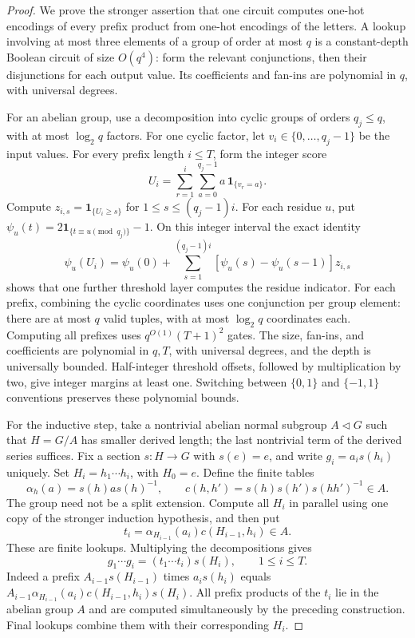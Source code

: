 \begin{proof}
We prove the stronger assertion that one circuit computes one-hot
encodings of every prefix product from one-hot encodings of the letters. A lookup involving at most three elements
of a group of order at most $q$ is a constant-depth Boolean circuit
of size $O(q^4)$: form the relevant conjunctions, then their disjunctions
for each output value. Its coefficients and fan-ins are polynomial in
$q$, with universal degrees.

For an abelian group, use a decomposition into cyclic groups of orders
$q_j\le q$, with at most $\log_2q$ factors. For one cyclic factor, let
$v_i\in\{0,\ldots,q_j-1\}$ be the input values. For every prefix length $i\le T$, form the
integer score
\[
 U_i=\sum_{r=1}^i\sum_{a=0}^{q_j-1}a\,\boldsymbol1_{\{v_r=a\}}.
\]
Compute $z_{i,s}=\boldsymbol1_{\{U_i\ge s\}}$ for
$1\le s\le(q_j-1)i$. For each residue $u$, put
$\psi_u(t)=2\boldsymbol1_{\{t\equiv u\pmod{q_j}\}}-1$.
On this integer interval the exact identity
\[
 \psi_u(U_i)=\psi_u(0)+
   \sum_{s=1}^{(q_j-1)i}[\psi_u(s)-\psi_u(s-1)]z_{i,s}
\]
shows that one further threshold layer computes the residue indicator.
For each prefix, combining the cyclic coordinates uses one conjunction
per group element: there are at most $q$ valid tuples, with at most
$\log_2q$ coordinates each. Computing all prefixes uses
$q^{O(1)}(T+1)^2$ gates. The size, fan-ins, and coefficients are
polynomial in $q,T$, with universal degrees, and the depth is
universally bounded. Half-integer threshold
offsets, followed by multiplication by two, give integer margins at
least one. Switching between $\{0,1\}$ and $\{-1,1\}$ conventions
preserves these polynomial bounds.

For the inductive step, take a nontrivial abelian normal subgroup
$A\triangleleft G$ such that $H=G/A$ has smaller derived length;
the last nontrivial term of the derived series suffices. Fix a section
$s:H\to G$ with $s(e)=e$, and write $g_i=a_i s(h_i)$ uniquely.
Set $H_i=h_1\cdots h_i$, with $H_0=e$. Define the finite tables
\[
 \alpha_h(a)=s(h)as(h)^{-1},\qquad
 c(h,h')=s(h)s(h')s(hh')^{-1}\in A.
\]
The group need not be a split extension. Compute all $H_i$ in parallel
using one copy of the stronger induction hypothesis, and then put
\[
 t_i=\alpha_{H_{i-1}}(a_i)c(H_{i-1},h_i)\in A.
\]
These are finite lookups. Multiplying the decompositions gives
\[
 g_1\cdots g_i=(t_1\cdots t_i)s(H_i),\qquad 1\le i\le T.
\]
Indeed a prefix $A_{i-1}s(H_{i-1})$ times $a_i s(h_i)$ equals
$A_{i-1}\alpha_{H_{i-1}}(a_i)c(H_{i-1},h_i)s(H_i)$.
All prefix products of the $t_i$ lie in the abelian group $A$ and are
computed simultaneously by the preceding construction. Final lookups
combine them with their corresponding $H_i$.


\end{proof}
